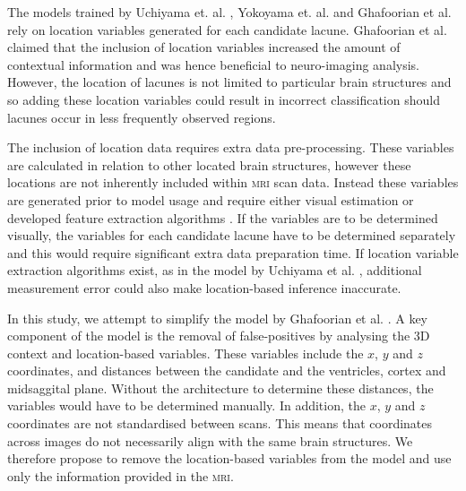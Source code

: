The models trained by Uchiyama et. al. \cite{UchiyamaYoshikazu2007Ioad}, Yokoyama et. al. \cite{Yokoyama2007} and Ghafoorian et al. \cite{GhafoorianM.2017Dml3} rely on location variables generated for each candidate lacune. Ghafoorian et al. \cite{GhafoorianM.2017Dml3} claimed that the inclusion of location variables increased the amount of contextual information and was hence beneficial to neuro-imaging analysis. However, the location of lacunes is not limited to particular brain structures \cite{WardlawJm2013Mosc} and so adding these location variables could result in incorrect classification should lacunes occur in less frequently observed regions.

The inclusion of location data requires extra data pre-processing. These variables are calculated in relation to other located brain structures, however these locations are not inherently included within \textsc{mri} scan data. Instead these variables are generated prior to model usage and require either visual estimation or developed feature extraction algorithms \cite{Uchiyama2007b, UchiyamaYoshikazu2007Ioad}. If the variables are to be determined visually, the variables for each candidate lacune have to be determined separately and this would require significant extra data preparation time. If location variable extraction algorithms exist, as in the model by Uchiyama et al. \cite{UchiyamaYoshikazu2007Ioad}, additional measurement error could also make location-based inference inaccurate.

In this study, we attempt to simplify the model by Ghafoorian et al. \cite{GhafoorianM.2017Dml3}. A key component of the model is the removal of false-positives by analysing the 3D context and location-based variables. These variables include the $x$, $y$ and $z$ coordinates, and distances between the candidate and the ventricles, cortex and midsaggital plane. Without the architecture to determine these distances, the variables would have to be determined manually. In addition, the  $x$, $y$ and $z$ coordinates are not standardised between scans. This means that coordinates across images do not necessarily align with the same brain structures. We therefore propose to remove the location-based variables from the model and use only the information provided in the \textsc{mri}.


%
%


